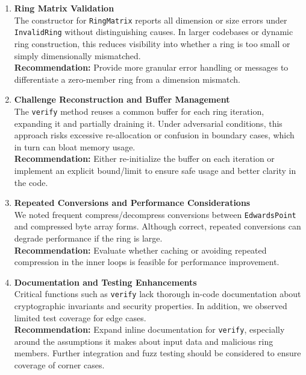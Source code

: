 \documentclass[12pt,a4paper]{article}
\begin{document}
\begin{enumerate}
  \item \textbf{Ring Matrix Validation} \\
  The constructor for \texttt{RingMatrix} reports all dimension or size errors under
  \texttt{InvalidRing} without distinguishing causes. In larger codebases or dynamic ring
  construction, this reduces visibility into whether a ring is too small or simply dimensionally
  mismatched.
  \\
  \textbf{Recommendation:} Provide more granular error handling or messages to differentiate
  a zero-member ring from a dimension mismatch.

  \item \textbf{Challenge Reconstruction and Buffer Management} \\
  The \texttt{verify} method reuses a common buffer for each ring iteration, expanding it
  and partially draining it. Under adversarial conditions, this approach risks excessive
  re-allocation or confusion in boundary cases, which in turn can bloat memory usage.
  \\
  \textbf{Recommendation:} Either re-initialize the buffer on each iteration or implement an
  explicit bound/limit to ensure safe usage and better clarity in the code.

  \item \textbf{Repeated Conversions and Performance Considerations} \\
  We noted frequent compress/decompress conversions between \texttt{EdwardsPoint} and compressed
  byte array forms. Although correct, repeated conversions can degrade performance if the ring is
  large.
  \\
  \textbf{Recommendation:} Evaluate whether caching or avoiding repeated compression in the
  inner loops is feasible for performance improvement.

  \item \textbf{Documentation and Testing Enhancements} \\
  Critical functions such as \texttt{verify} lack thorough in-code documentation about cryptographic
  invariants and security properties. In addition, we observed limited test coverage for edge cases.
  \\
  \textbf{Recommendation:} Expand inline documentation for \texttt{verify}, especially around
  the assumptions it makes about input data and malicious ring members. Further integration and
  fuzz testing should be considered to ensure coverage of corner cases.


\end{enumerate}
\end{document}
